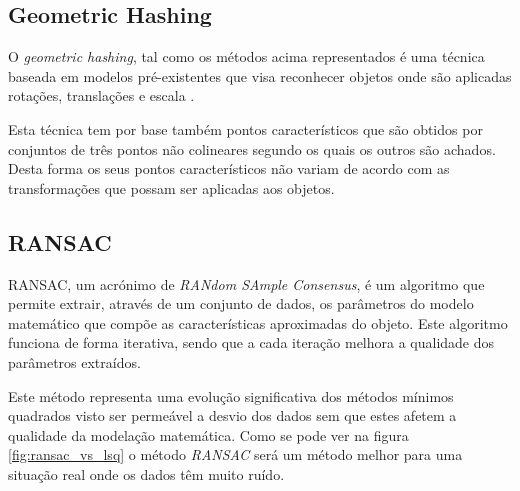 \subsection{Geometric Hashing}

O \emph{geometric hashing}, tal como os métodos acima representados é uma técnica baseada em modelos pré-existentes que visa reconhecer objetos onde são aplicadas rotações, translações e escala \cite{1989SPIE.1095..515C}.

Esta técnica tem por base também pontos característicos que são obtidos por conjuntos de três pontos não colineares segundo os quais os outros são achados. 
Desta forma os seus pontos característicos não variam de acordo com as transformações que possam ser aplicadas aos objetos.


\subsection{RANSAC}

RANSAC\cite{Fischler:1981:RSC:358669.358692}, um acrónimo de \emph{RANdom SAmple Consensus}, é um algoritmo que permite extrair, através de um conjunto de dados, os parâmetros do modelo matemático que compõe as características aproximadas do objeto. Este algoritmo funciona de forma iterativa, sendo que a cada iteração melhora a qualidade dos parâmetros extraídos.

Este método representa uma evolução significativa dos métodos mínimos quadrados visto ser permeável a desvio dos dados sem que estes afetem a qualidade da modelação matemática.
Como se pode ver na figura \ref{fig:ransac_vs_lsq} o método \emph{RANSAC} será um método melhor para uma situação real onde os dados têm muito ruído.


